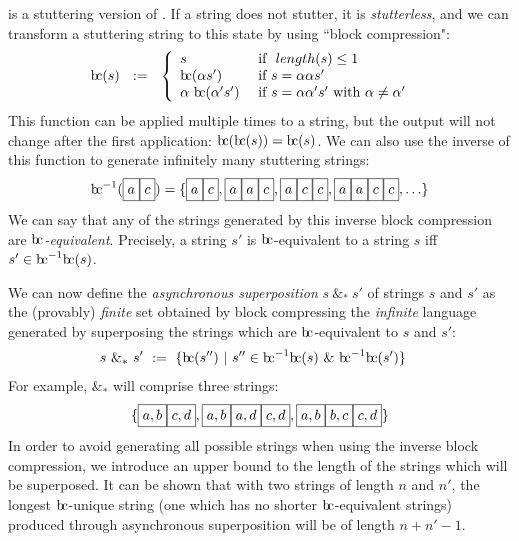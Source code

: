 \documentclass[a4paper,11pt,leqno]{article}
\newcommand{\bc}{{\rm b\!c}}
\newcommand{\vph}[1]{\vphantom{#1}}
\newcommand{\ebox}[1]{\fbox{$\vph{',}#1$}}
\newcommand{\eboxl}[1]{\fbox{$\vph{'}#1$}}
\begin{document}
 is a stuttering version of 
\eboxl{a}\eboxl{c}. If 
a string does not 
stutter, it is \textit{stutterless}, and we can transform a stuttering string 
to this 
state by using ``block compression":
\begin{align}
\bc(s)  &\ \ :=\ \
\left\{ \begin{array}{ll}
s & \mbox{ if }~length(s)\leq 1 \\
\bc({\alpha}s')  & \mbox{ if } s={\alpha}{\alpha}s'\\
\alpha ~{\bc}({\alpha'}{s'})  
& \mbox{ if } s=\alpha{\alpha'}{s'} \mbox{ with } \alpha\neq\alpha'
\end{array}
\right. 
\end{align}
This function can be applied multiple times to a string, but the output will 
not change after the first application: $\bc(\bc(s)) = \bc(s)$. We can also use 
the inverse of this function to generate infinitely many stuttering strings:
\begin{align}
\bc^{-1}(\ebox{a}\ebox{c}) = 
\{ \ebox{a}\ebox{c},
\ebox{a}\ebox{a}\ebox{c},
\ebox{a}\ebox{c}\ebox{c}, 
\ebox{a}\ebox{a}\ebox{c}\ebox{c}, 
\ldots \}
\end{align}
We can say that any of the strings generated by this inverse block compression 
are \textit{$\bc{}$-equivalent}. Precisely, a string $s'$ is $\bc{}$-equivalent 
to a 
string 
$s$ iff $s' \in \bc^{-1}\bc(s)$.

We can now define the \textit{asynchronous superposition} $s~\&_*~s'$ of 
strings $s$ and 
$s'$ as the (provably) \textit{finite} set obtained by block compressing the 
\textit{infinite} 
language generated by superposing the strings which are $\bc$-equivalent to $s$ 
and $s'$:
\begin{align}
s\ \&_* \ s' & \ := \
\{\bc(s'') \ | \ s''\in \bc^{-1}\bc(s)\ \& \ \bc^{-1}\bc(s')\}
\end{align}
For example, \ebox{a}\ebox{c} $\&_*$ 
\ebox{b}\ebox{d} will comprise 
three strings:
\begin{align}
\{ \ebox{a, b}\ebox{c, d},
\ebox{a, b}\ebox{a, d}\ebox{c, d},
\ebox{a, b}\ebox{b, c}\ebox{c, d} \}
\end{align}
In order to avoid generating all possible strings when using the inverse block 
compression, we introduce an upper bound to the length of the strings which 
will be superposed. It can be shown that with two strings of length $n$ and 
$n'$, the longest $\bc$-unique string (one which has no shorter 
$\bc$-equivalent strings) produced through asynchronous superposition will be 
of length $n+n'-1$.
\end{document}
